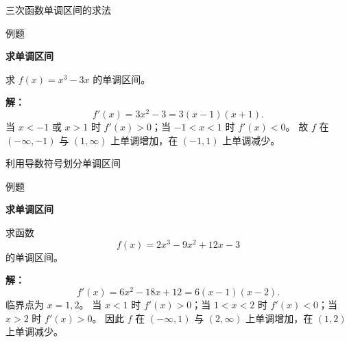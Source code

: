 \documentclass[aspectratio=169,10pt,fontset=fandol]{ctexbeamer}
\begin{document}
\begin{frame}[t,fragile]{三次函数单调区间的求法}
\normalsize
\begin{block}{例题}
{\normalsize
\textbf{求单调区间}\par

求 $f(x)=x^3-3x$ 的单调区间。

}
\end{block}
\pause
{\normalsize
\textbf{解：}
\[
f'(x)=3x^2-3=3(x-1)(x+1).
\]
当 $x<-1$ 或 $x>1$ 时 $f'(x)>0$；当 $-1<x<1$ 时 $f'(x)<0$。 故 $f$ 在 $(-\infty,-1)$ 与 $(1,\infty)$ 上单调增加，在 $(-1,1)$ 上单调减少。

}
\end{frame}
\begin{frame}[t,fragile]{利用导数符号划分单调区间}
\normalsize
\begin{block}{例题}
{\normalsize
\textbf{求单调区间}\par

求函数
\[
f(x)=2x^3-9x^2+12x-3
\]
的单调区间。

}
\end{block}
\pause
{\normalsize
\textbf{解：}
\[
f'(x)=6x^2-18x+12=6(x-1)(x-2).
\]
临界点为 $x=1,2$。 当 $x<1$ 时 $f'(x)>0$；当 $1<x<2$ 时 $f'(x)<0$；当 $x>2$ 时 $f'(x)>0$。 因此 $f$ 在 $(-\infty,1)$ 与 $(2,\infty)$ 上单调增加，在 $(1,2)$ 上单调减少。

}
\end{frame}
\end{document}
